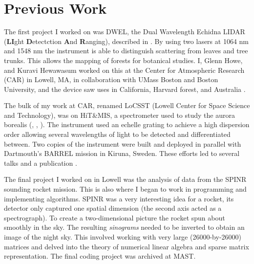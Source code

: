 \documentclass{article}
\begin{document}
    \section{Previous Work}
        The first project I worked on was DWEL, the
        Dual Wavelength Echidna LIDAR
        (\textbf{LI}ght \textbf{D}etectction \textbf{A}nd \textbf{R}anging),
        described in \cite{DWEL2012}.
        By using two lasers at 1064 nm and 1548 nm the instrument is able
        to distinguish scattering from leaves and tree trunks. This allows
        the mapping of forests for botanical studies. I, Glenn Howe, and
        Kuravi Hewawasum worked on this at the Center for Atmospheric
        Research (CAR) in Lowell, MA, in collaboration with UMass Boston
        and Boston University, and the device saw uses in California,
        Harvard forest, and Australia
        \cite{Li2016RadiometricCO}.
        \par\hfill\par
        The bulk of my work at CAR, renamed LoCSST
        (Lowell Center for Space Science and Technology), was on
        HiT\&MIS, a spectrometer used to study the aurora borealis
        (\cite{2011AGUFMSA13B1890C}, \cite{2014AGUFMSA13B4000H},
        \cite{2015AGUFMSA13B2369A}). The
        instrument used an echelle grating to achieve a high dispersion
        order allowing several wavelengths of light to be detected and
        differentiated between. Two copies of the instrument were built
        and deployed in parallel with Dartmouth's BARREL mission in
        Kiruna, Sweden. These efforts led to several talks and a
        publication \cite{AryalHewawasamMaguire2018DerivationHitAndMIS}.
        \par\hfill\par
        The final project I worked on in Lowell was the analysis of data
        from the SPINR sounding rocket mission. This is also where I began
        to work in programming and implementing algorithms. SPINR was a very
        interesting idea for a rocket, its detector only captured one
        spatial dimension (the second axis acted as a spectrograph). To
        create a two-dimensional picture the rocket spun about smoothly
        in the sky. The resulting \textit{sinograms} needed to be inverted
        to obtain an image of the night sky. This involved working with
        very large (26000-by-26000) matrices and delved into the theory of
        numerical linear algebra and sparse matrix representation. The
        final coding project was archived at MAST.
    
    
\end{document}
